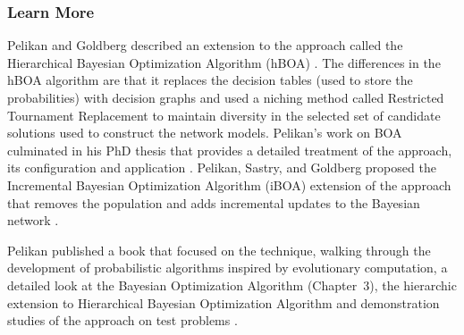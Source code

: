 % 
% 
\subsubsection{Learn More}
Pelikan and Goldberg described an extension to the approach called the Hierarchical Bayesian Optimization Algorithm (hBOA) \cite{Pelikan2000, Pelikan2001b}. The differences in the hBOA algorithm are that it replaces the decision tables (used to store the probabilities) with decision graphs and used a niching method called Restricted Tournament Replacement to maintain diversity in the selected set of candidate solutions used to construct the network models.
Pelikan's work on BOA culminated in his PhD thesis that provides a detailed treatment of the approach, its configuration and application \cite{Pelikan2002a}.
Pelikan, Sastry, and Goldberg proposed the Incremental Bayesian Optimization Algorithm (iBOA) extension of the approach that removes the population and adds incremental updates to the Bayesian network \cite{Pelikan2008}.

Pelikan published a book that focused on the technique, walking through the development of probabilistic algorithms inspired by evolutionary computation, a detailed look at the Bayesian Optimization Algorithm (Chapter~3), the hierarchic extension to Hierarchical Bayesian Optimization Algorithm and demonstration studies of the approach on test problems \cite{Pelikan2005}.


